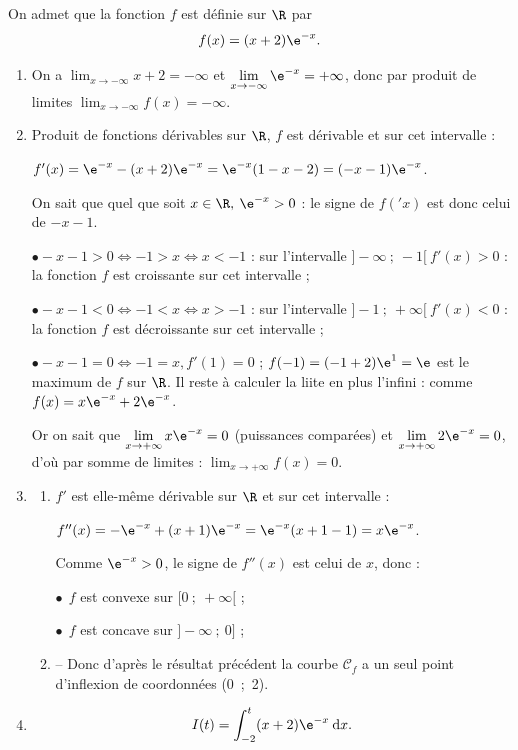 On admet que la fonction $f$ est définie sur $\R$ par 
\[f(x) = (x + 2)\e^{-x}.\]

\smallskip

\begin{enumerate}
\item %
On a $\displaystyle\lim_{x \to -\infty} x + 2 = - \infty$ et $\displaystyle\lim_{x \to -\infty}
\e^{-x} = + \infty$, donc par produit de limites $\displaystyle\lim_{x \to -\infty}f(x) = - \infty$.

\item %
Produit de fonctions dérivables sur $\R$, $f$ est dérivable et sur cet intervalle :

$f'(x) = \e^{-x} - (x + 2)\e^{-x} = \e^{-x}(1 - x - 2) = (- x - 1)\e^{-x}$.

On sait que quel que soit $x \in \R, \: \e^{-x} > 0$ : le signe de $f('x)$ est donc celui de $- x - 1$.

$\bullet -x - 1 > 0 \iff - 1 > x \iff x < - 1$ : sur l'intervalle $]- \infty~;~-1[ \: f'(x) > 0$ : la fonction $f$ est croissante sur cet intervalle ;

$\bullet -x - 1 < 0 \iff - 1 < x \iff x > - 1$ : sur l'intervalle $]-1 ~;~+\infty[\: f'(x) < 0$ : la fonction $f$ est décroissante sur cet intervalle ;

$\bullet -x - 1 = 0 \iff - 1 = x, f'(1) = 0$ ; $f(-1) = (-1 + 2)\e^{1} = \e$ est le maximum de $f$ sur $\R$.
Il reste à calculer la liite en plus l'infini : comme $f(x) = x\e^{-x} + 2\e^{-x}$.

Or on sait que $\displaystyle\lim_{x \to + \infty} x\e^{-x} = 0$ (puissances comparées) et $\displaystyle\lim_{x \to + \infty} 2\e^{-x} = 0$, d'où par somme de limites :
$\displaystyle\lim_{x \to + \infty} f(x) = 0$.
\item 
	\begin{enumerate}
		\item %
$f'$ est elle-même dérivable sur $\R$ et sur cet intervalle :

$f''(x) = -\e^{-x} + (x + 1)\e^{-x} = \e^{-x}(x + 1 - 1) = x \e^{-x}$.

Comme $\e^{-x} > 0$, le signe de $f''(x)$ est celui de $x$, donc :

$\bullet~~$$f$ est convexe sur $[0~;~+ \infty[$ ;

$\bullet~~$$f$ est concave sur $]- \infty~;~0]$ ;
		\item %
-- Donc d'après le résultat précédent la courbe $\mathcal{C}_f$ a un seul point d'inflexion de coordonnées (0~;~2).
	\end{enumerate}
\item %
\[I(t) = \displaystyle\int_{-2}^t (x + 2)\e^{-x}\:\text{d}x.\]


\end{enumerate}
